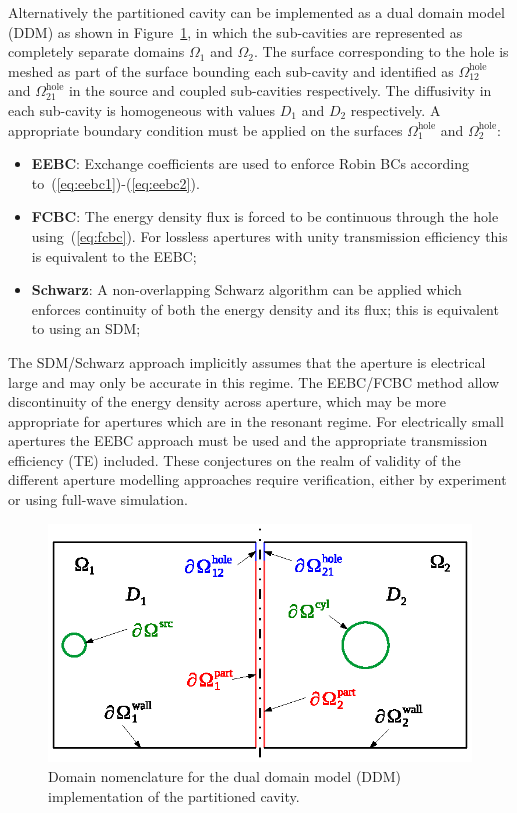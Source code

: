 \documentclass[a4paper]{article}
\numberwithin{equation}{section}
\newcounter{Figure}
\begin{document}
Alternatively the partitioned cavity can be implemented as a dual domain model (DDM) as shown in
Figure~\ref{fg:ddm}, in which the sub-cavities are represented as completely separate domains 
$\Omega_1$ and $\Omega_2$. The surface corresponding to the hole is meshed as part of the surface
bounding each sub-cavity and identified as $\Omega^\mathrm{hole}_{12}$ and $\Omega^\mathrm{hole}_{21}$ in 
the source and coupled sub-cavities respectively. The diffusivity in each sub-cavity is homogeneous
with values $D_1$ and $D_2$ respectively. A appropriate boundary condition must be applied on the 
surfaces $\Omega^\mathrm{hole}_1$ and $\Omega^\mathrm{hole}_2$:
\begin{itemize}
 \item \textbf{EEBC}: Exchange coefficients are used to enforce Robin BCs according to~(\ref{eq:eebc1})-(\ref{eq:eebc2}).
 \item \textbf{FCBC}: The energy density flux is forced to be continuous through the hole using~(\ref{eq:fcbc}). For lossless apertures
 with unity transmission efficiency this is equivalent to the EEBC; 
 \item \textbf{Schwarz}: A non-overlapping Schwarz algorithm can be applied which enforces continuity of both
 the energy density and its flux; this is equivalent to using an SDM;
\end{itemize}
The SDM/Schwarz approach implicitly assumes that the aperture is electrical large and may only be accurate in this
regime. The EEBC/FCBC method allow discontinuity of the energy density across aperture, which may be more appropriate 
for apertures which are in the resonant regime. For electrically small apertures the EEBC approach must be used and the 
appropriate transmission efficiency (TE) included. These conjectures on the realm of validity of the different aperture modelling approaches
require verification, either by experiment or using full-wave simulation.

\begin{figure}[ht]
\begin{center}
\includegraphics[width=0.6\linewidth]{figures/domains2}
\vspace{-4mm}
\caption{\label{fg:ddm} Domain nomenclature for the dual domain model (DDM) implementation of the partitioned cavity.}
\end{center}
\end{figure}
\end{document}
